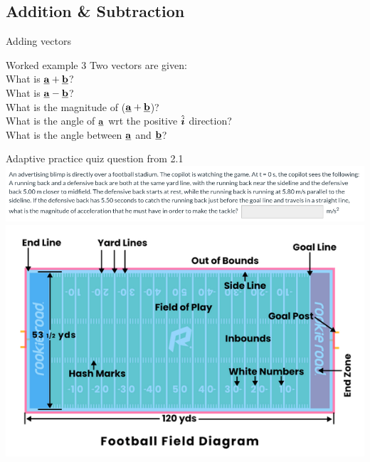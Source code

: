 
 \subsection{Addition \& Subtraction} %
 
 
\begin{frame}{Adding vectors}
\small

\end{frame}


 \begin{frame}{Worked example 3}
\small
Two vectors are given:\\[2ex]
What is $\underline{\mathbf{a}} + \underline{\mathbf{b}}$? \\[2ex]
What is $\underline{\mathbf{a}} - \underline{\mathbf{b}}$? \\[2ex]
What is the magnitude of ($\underline{\mathbf{a}} + \underline{\mathbf{b}}$)? \\[2ex]
What is the angle of $\underline{\mathbf{a}}$ wrt the positive $\hat{\boldsymbol{i}}$ direction?\\[2ex]
What is the angle between $\underline{\mathbf{a}}$ and $\underline{\mathbf{b}}$?\\[2ex]
\end{frame}


\begin{frame}{Adaptive practice quiz question from 2.1 }
\small
\includegraphics[scale=0.34]{americanfootball}
\includegraphics[scale=0.34]{field}


\end{frame}


